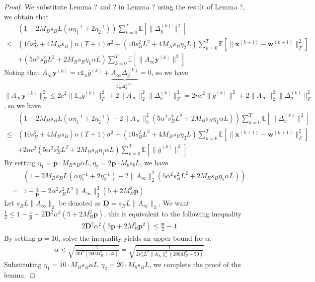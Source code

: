 \documentclass{article}
\newcommand{\vw}{{\mathbf{w}}}
\newcommand{\vx}{{\mathbf{x}}}
\newcommand{\vy}{{\mathbf{y}}}
\newcommand{\EE}[1]{\mathbb{E}\left[#1\right]}
\newcommand{\norm}[1]{\| #1 \|}
\newcommand{\one}{\mathds{1}_n}
\begin{document}
\begin{proof}
We substitute Lemma ? and ? in Lemma ? using the result of Lemma ?, we obtain that 
\begin{align*}
  &\left(1-2M_Bs_BL(\alpha\eta_1^{-1}+2\eta_2^{-1})\right)\sum_{k=0}^T \EE{\norm{\Delta_y^{(k)}}^2}\\ 
  \leq &(10s_B^2+4M_Bs_B)n(T+1)\sigma^2+(10s_B^2L^2+4M_Bs_B\eta_2 L)\sum_{k=0}^T\EE{\norm{\vx^{(k+1)}-\vw^{(k+1)}}_F^2}\\&+(5\alpha^2s_B^2L^2+2M_Bs_B\eta_1\alpha L) \sum_{k=0}^T \EE{\norm{A_{\infty}\vy^{(k)}}^2}
\end{align*}
Noting that $A_{\infty}\vy^{(k)}=c\one\bar{g}^{(k)}+\underbrace{A_{\infty}\Delta_{y}^{(k)}}_{\one^T\Delta_{y}^{(k)}}=0$, so we have $\norm{A_{\infty }\vy^{(k)}}^2_F\leq 2c^2 \norm{\one\bar{g}^{(k)}}_F^2+2 \norm{A_{\infty}}_2^2\norm{\Delta_y^{(k)}}_F^2= 2 nc^2 \norm{\bar{g}^{(k)}}^2+ 2\norm{A_{\infty}}_2^2\norm{\Delta_y^{(k)}}_F^2$, so we have
\begin{align*}
  &\left(1-2M_Bs_BL(\alpha\eta_1^{-1}+2\eta_2^{-1})-2\norm{A_{\infty}}_2^2(5\alpha^2s_B^2L^2+2M_Bs_B\eta_1\alpha L) \right)\sum_{k=0}^T \EE{\norm{\Delta_y^{(k)}}^2}\\ 
  \leq &(10s_B^2+4M_Bs_B)n (T+1)\sigma^2+(10s_B^2L^2+4M_Bs_B\eta_2 L)\sum_{k=0}^T\EE{\norm{\vx^{(k+1)}-\vw^{(k+1)}}_F^2}\\&+2nc^2(5\alpha^2s_B^2L^2+2M_Bs_B\eta_1\alpha L) \sum_{k=0}^T \EE{\norm{\bar{g}^{(k)}}^2}
\end{align*}
By setting $\eta_1=\mathbf{p}\cdot M_Bs_B\alpha L,\eta_2=2\mathbf{p}\cdot M_bs_bL$, we have
\begin{align*}
  &\left(1-2M_Bs_BL(\alpha\eta_1^{-1}+2\eta_2^{-1})-2\norm{A_{\infty}}_2^2(5\alpha^2s_B^2L^2+2M_Bs_B\eta_1\alpha L) \right)\\ 
  =&1- \frac{4}{\mathbf{p}}-2\alpha^2s_B^2L^2\norm{A_{\infty}}_2^2(5+2M_B^2 \mathbf{p})
\end{align*}
Let $s_BL\norm{A_{\infty}}_2$ be denoted as $\mathbf{D}=s_BL\norm{A_{\infty}}_2$. We want $\frac{1}{2}\leq 1- \frac{4}{\mathbf{p}}-2\mathbf{D}^2\alpha^2(5+2M_B^2 \mathbf{p})$, this is equivalent to the following inequality 
\begin{align*}
  2\mathbf{D}^2\alpha^2(5\mathbf{p}+2M_B^2\mathbf{p}^2)\leq \frac{\mathbf{p}}{2}-4
\end{align*}
By setting $\mathbf{p}=10$, solve the inequality yields an upper bound for $\alpha$:
\begin{align*}
  \alpha < \sqrt{\frac{1}{2\mathbf{D}^2(200M_B^2+50)}} =  \sqrt{\frac{1}{2s_B^2L^2\norm{A_{\infty}}_2^2(200M_B^2+50)}}
\end{align*}
Substituting $\eta_1=10\cdot M_Bs_B\alpha L,\eta_2=20\cdot M_bs_BL$, we complete the proof of the lemma.
\end{proof}
\end{document}
